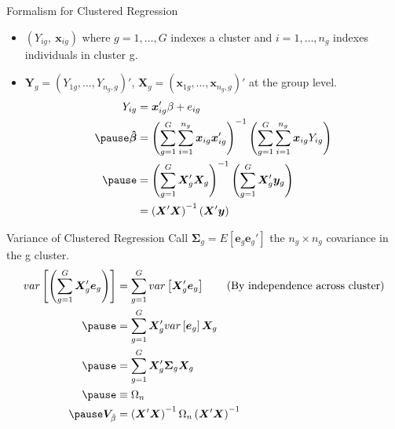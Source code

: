 \documentclass[aspectratio=169, handout, t]{beamer}
\numberwithin{equation}{section}
\begin{document}
\begin{frame}{Formalism for Clustered Regression}
\begin{itemize}
\item $(Y_{ig},\ \bm{x}_{ig})$ where $g=1, \ldots, G$ indexes a cluster and $i=1,\ldots, n_g$ indexes individuals in cluster g. \pause
\item $\bm{Y}_g=(Y_{1g},\ldots, Y_{n_g,g})'$, $\bm{X}_g=(\bm{x}_{1g},\ldots, \bm{x}_{n_g,g})'$ at the group level. \pause
\begin{align*}
Y_{ig}&=\bm{x}_{ig}'\beta+e_{ig}\\ \pause
\bm{\hat{\beta}}&=\left(\sum_{g=1}^G \sum_{i=1}^{n_g}\bm{x}_{ig}\bm{x}_{ig}'\right)^{-1}\left(\sum_{g=1}^G \sum_{i=1}^{n_g}\bm{x}_{ig}Y_{ig}\right)\\ \pause
&=\left(\sum_{g=1}^G \bm{X}'_{g}\bm{X}_{g}\right)^{-1}\left(\sum_{g=1}^G \bm{X}'_{g}\bm{y}_{g}\right)\\
&=\left(\bm{X}'\bm{X}\right)^{-1}\left(\bm{X}'\bm{y}\right)
\end{align*}

\end{itemize}
\end{frame}



\begin{frame}{Variance of Clustered Regression}
Call $\bm{\Sigma}_g=E\left[\bm{e}_g\bm{e}_g'\right]$ the $n_g\times n_g$ covariance in the g cluster. \pause
\begin{align*}
var\left[\left(\sum_{g=1}^G \bm{X}_g'\bm{e}_g\right)\right]&=\sum_{g=1}^G var\left[\bm{X}_g'\bm{e}_g\right] \tag{By independence across cluster}\\ \pause
&=\sum_{g=1}^G \bm{X}_g'var\left[\bm{e}_g\right]\bm{X}_g\\ \pause
&=\sum_{g=1}^G \bm{X}_g'\bm{\Sigma}_g\bm{X}_g\\ \pause
&\equiv \Omega_n\\ \pause
\bm{V}_{\hat{\beta}}&=\left(\bm{X}'\bm{X}\right)^{-1}\Omega_n\left(\bm{X}'\bm{X}\right)^{-1}
\end{align*}
\end{frame}
\end{document}
